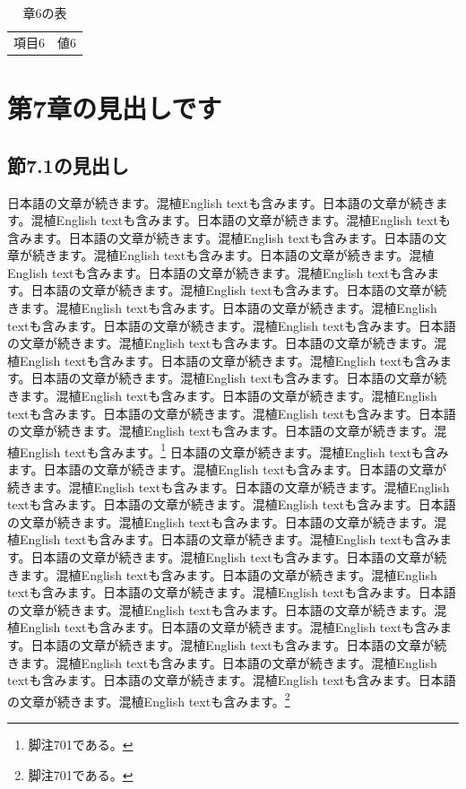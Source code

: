 \documentclass[pdflatex,book]{jlreq}
\begin{document}
\begin{table}[htbp]\centering\caption{章6の表}\begin{tabular}{cc}項目6 & 値6\\\end{tabular}\end{table}

\chapter{第7章の見出しです}
\section{節7.1の見出し}
日本語の文章が続きます。混植English textも含みます。日本語の文章が続きます。混植English textも含みます。日本語の文章が続きます。混植English textも含みます。日本語の文章が続きます。混植English textも含みます。日本語の文章が続きます。混植English textも含みます。日本語の文章が続きます。混植English textも含みます。日本語の文章が続きます。混植English textも含みます。日本語の文章が続きます。混植English textも含みます。日本語の文章が続きます。混植English textも含みます。日本語の文章が続きます。混植English textも含みます。日本語の文章が続きます。混植English textも含みます。日本語の文章が続きます。混植English textも含みます。日本語の文章が続きます。混植English textも含みます。日本語の文章が続きます。混植English textも含みます。日本語の文章が続きます。混植English textも含みます。日本語の文章が続きます。混植English textも含みます。日本語の文章が続きます。混植English textも含みます。日本語の文章が続きます。混植English textも含みます。日本語の文章が続きます。混植English textも含みます。日本語の文章が続きます。混植English textも含みます。\footnote{脚注701である。}
日本語の文章が続きます。混植English textも含みます。日本語の文章が続きます。混植English textも含みます。日本語の文章が続きます。混植English textも含みます。日本語の文章が続きます。混植English textも含みます。日本語の文章が続きます。混植English textも含みます。日本語の文章が続きます。混植English textも含みます。日本語の文章が続きます。混植English textも含みます。日本語の文章が続きます。混植English textも含みます。日本語の文章が続きます。混植English textも含みます。日本語の文章が続きます。混植English textも含みます。日本語の文章が続きます。混植English textも含みます。日本語の文章が続きます。混植English textも含みます。日本語の文章が続きます。混植English textも含みます。日本語の文章が続きます。混植English textも含みます。日本語の文章が続きます。混植English textも含みます。日本語の文章が続きます。混植English textも含みます。日本語の文章が続きます。混植English textも含みます。日本語の文章が続きます。混植English textも含みます。日本語の文章が続きます。混植English textも含みます。日本語の文章が続きます。混植English textも含みます。\footnote{脚注701である。}
\end{document}
